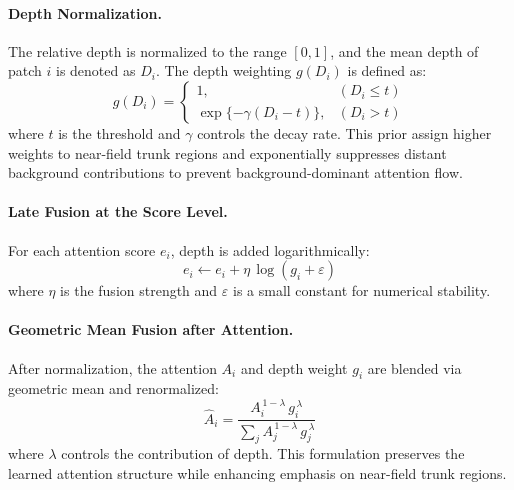 \paragraph{Depth Normalization.}
The relative depth is normalized to the range $[0, 1]$, and the mean depth of patch $i$ is denoted as $D_i$. The depth weighting $g(D_i)$ is defined as:
\begin{equation}\tag{11}
g(D_i)=
\begin{cases}
1, & (D_i\le t)\\
\exp\{-\gamma(D_i-t)\}, & (D_i>t)
\end{cases}
\end{equation}
where $t$ is the threshold and $\gamma$ controls the decay rate. This prior assign higher weights to near-field trunk regions and exponentially suppresses distant background contributions to prevent background-dominant attention flow.

\paragraph{Late Fusion at the Score Level.}
For each attention score $e_i$, depth is added logarithmically:
\begin{equation}\tag{12}
e_i \leftarrow e_i + \eta \, \log(g_i+\varepsilon)
\end{equation}
where $\eta$ is the fusion strength and $\varepsilon$ is a small constant for numerical stability.

\paragraph{Geometric Mean Fusion after Attention.}
After normalization, the attention $A_i$ and depth weight $g_i$ are blended via geometric mean and renormalized:
\begin{equation}\tag{13}
\hat{A}_i=\frac{A_i^{\,1-\lambda}\, g_i^{\,\lambda}}{\sum_j A_j^{\,1-\lambda}\, g_j^{\,\lambda}}
\end{equation}
where $\lambda$ controls the contribution of depth. This formulation preserves the learned attention structure while enhancing emphasis on near-field trunk regions.

